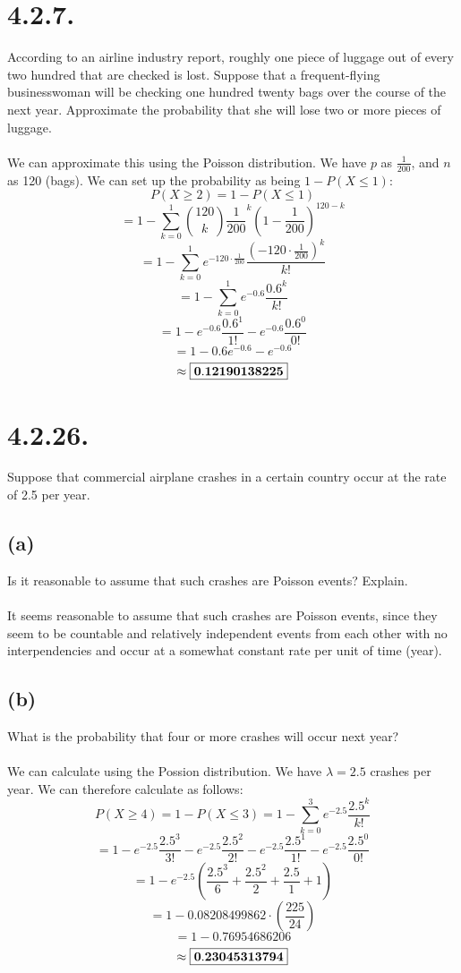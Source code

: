 \documentclass{article}
\begin{document}
{\section*{4.2.7.}
According to an airline industry report, roughly one piece of luggage out of every two hundred that are checked is lost. Suppose that a frequent-flying businesswoman will be checking one hundred twenty bags over the course of the next year. Approximate the probability that she will lose two or more pieces of luggage.
\\
\\
We can approximate this using the Poisson distribution. We have \(p\) as \(\frac{1}{200}\), and \(n\) as 120 (bags). We can set up the probability as being \(1 - P(X \leq 1)\):
\[
P(X \geq 2) = 1 - P(X \leq 1)
\]
\[
= 1 - \sum_{k=0}^{1} \binom{120}{k} \frac{1}{200}^k (1-\frac{1}{200})^{120-k}
\]
\[
= 1 - \sum_{k=0}^{1} e^{-120 \cdot \frac{1}{200}} \frac{(-120 \cdot \frac{1}{200})^k}{k!}
\]
\[
= 1 - \sum_{k=0}^{1} e^{-0.6} \frac{0.6^k}{k!}
\]
\[
= 1 -  e^{-0.6}\frac{0.6^1}{1!} - e^{-0.6} \frac{0.6^0}{0!}
\]
\[
= 1 -  0.6e^{-0.6} - e^{-0.6}
\]
\[
\approx \fbox{\(\mathbf{0.12190138225}\)}
\]

\section*{4.2.26.}
Suppose that commercial airplane crashes in a certain country occur at the rate of 2.5 per year.

\subsection*{(a)} 
Is it reasonable to assume that such crashes are Poisson events? Explain.
\\
\\
It seems reasonable to assume that such crashes are Poisson events, since they seem to be countable and relatively independent events from each other with no interpendencies and occur at a somewhat constant rate per unit of time (year).

\subsection*{(b)} 
What is the probability that four or more crashes will occur next year?
\\
\\
We can calculate using the Possion distribution. We have \( \lambda = 2.5 \) crashes per year. We can therefore calculate as follows:
\[
P(X \geq 4) = 1 - P(X \leq 3) = 1 - \sum_{k=0}^{3} e^{-2.5} \frac{2.5^k}{k!} 
\]
\[
= 1 - e^{-2.5} \frac{2.5^3}{3!}  - e^{-2.5} \frac{2.5^2}{2!} - e^{-2.5} \frac{2.5^1}{1!} - e^{-2.5} \frac{2.5^0}{0!}
\]
\[
= 1 - e^{-2.5} (\frac{2.5^3}{6} + \frac{2.5^2}{2} + \frac{2.5}{1} + 1) 
\]
\[
= 1 - 0.08208499862 \cdot (\frac{225}{24})
\]
\[
= 1 - 0.76954686206
\]
\[
\approx \fbox{\(\mathbf{0.23045313794}\)}
\]

}
\end{document}
